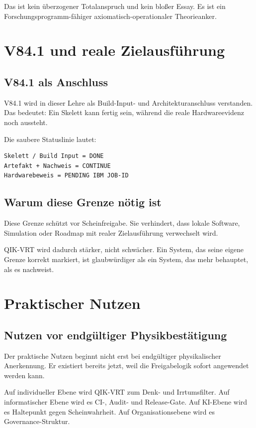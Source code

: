 \documentclass[11pt,a4paper,oneside]{book}
\begin{document}
Das ist kein überzogener Totalanspruch und kein bloßer Essay. Es ist ein Forschungsprogramm-fähiger axiomatisch-operationaler Theorieanker.

\chapter{V84.1 und reale Zielausführung}

\section{V84.1 als Anschluss}

V84.1 wird in dieser Lehre als Build-Input- und Architekturanschluss verstanden. Das bedeutet: Ein Skelett kann fertig sein, während die reale Hardwareevidenz noch aussteht.

Die saubere Statuslinie lautet:

\begin{lstlisting}
Skelett / Build Input = DONE
Artefakt + Nachweis = CONTINUE
Hardwarebeweis = PENDING IBM JOB-ID
\end{lstlisting}

\section{Warum diese Grenze nötig ist}

Diese Grenze schützt vor Scheinfreigabe. Sie verhindert, dass lokale Software, Simulation oder Roadmap mit realer Zielausführung verwechselt wird.

QIK-VRT wird dadurch stärker, nicht schwächer. Ein System, das seine eigene Grenze korrekt markiert, ist glaubwürdiger als ein System, das mehr behauptet, als es nachweist.

\chapter{Praktischer Nutzen}

\section{Nutzen vor endgültiger Physikbestätigung}

Der praktische Nutzen beginnt nicht erst bei endgültiger physikalischer Anerkennung. Er existiert bereits jetzt, weil die Freigabelogik sofort angewendet werden kann.

Auf individueller Ebene wird QIK-VRT zum Denk- und Irrtumsfilter. Auf informatischer Ebene wird es CI-, Audit- und Release-Gate. Auf KI-Ebene wird es Haltepunkt gegen Scheinwahrheit. Auf Organisationsebene wird es Governance-Struktur.
\end{document}
